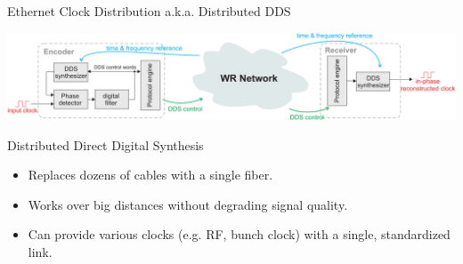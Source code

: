 \documentclass[compress,red]{beamer}
\begin{document}
\begin{frame}{Ethernet Clock Distribution a.k.a. Distributed DDS}
  \begin{center}
    \includegraphics[width=\columnwidth]{applications/remote_dds.pdf}
  \end{center}
  \begin{block}{Distributed Direct Digital Synthesis}
    \begin{itemize}
    \item Replaces dozens of cables with a single fiber.
    \item Works over big distances without degrading signal quality.
    \item Can provide various clocks (e.g. RF, bunch clock) with a single, standardized link.
    \end{itemize}
  \end{block}
\end{frame}
\end{document}

